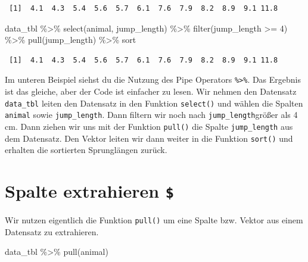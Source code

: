\documentclass[
  letterpaper,
]{scrbook}
\newenvironment{Shaded}{\begin{snugshade}}{\end{snugshade}}
\newcommand{\DecValTok}[1]{\textcolor[rgb]{0.68,0.00,0.00}{#1}}
\newcommand{\FunctionTok}[1]{\textcolor[rgb]{0.28,0.35,0.67}{#1}}
\newcommand{\NormalTok}[1]{\textcolor[rgb]{0.00,0.23,0.31}{#1}}
\newcommand{\SpecialCharTok}[1]{\textcolor[rgb]{0.37,0.37,0.37}{#1}}
\begin{document}
\begin{verbatim}
 [1]  4.1  4.3  5.4  5.6  5.7  6.1  7.6  7.9  8.2  8.9  9.1 11.8
\end{verbatim}

\begin{Shaded}
\begin{Highlighting}[]
\NormalTok{data\_tbl }\SpecialCharTok{\%\textgreater{}\%} 
  \FunctionTok{select}\NormalTok{(animal, jump\_length) }\SpecialCharTok{\%\textgreater{}\%} 
  \FunctionTok{filter}\NormalTok{(jump\_length }\SpecialCharTok{\textgreater{}=} \DecValTok{4}\NormalTok{) }\SpecialCharTok{\%\textgreater{}\%} 
  \FunctionTok{pull}\NormalTok{(jump\_length) }\SpecialCharTok{\%\textgreater{}\%} 
\NormalTok{  sort}
\end{Highlighting}
\end{Shaded}

\begin{verbatim}
 [1]  4.1  4.3  5.4  5.6  5.7  6.1  7.6  7.9  8.2  8.9  9.1 11.8
\end{verbatim}

Im unteren Beispiel siehst du die Nutzung des Pipe Operators
\texttt{\%\textgreater{}\%}. Das Ergebnis ist das gleiche, aber der Code
ist einfacher zu lesen. Wir nehmen den Datensatz \texttt{data\_tbl}
leiten den Datensatz in den Funktion \texttt{select()} und wählen die
Spalten \texttt{animal} sowie \texttt{jump\_length}. Dann filtern wir
noch nach \texttt{jump\_length}größer als 4 cm. Dann ziehen wir uns mit
der Funktion \texttt{pull()} die Spalte \texttt{jump\_length} aus dem
Datensatz. Den Vektor leiten wir dann weiter in die Funktion
\texttt{sort()} und erhalten die sortierten Sprunglängen zurück.

\hypertarget{sec-dollar}{%
\section{\texorpdfstring{Spalte extrahieren
\texttt{\$}}{Spalte extrahieren \$}}\label{sec-dollar}}

Wir nutzen eigentlich die Funktion \texttt{pull()} um eine Spalte bzw.
Vektor aus einem Datensatz zu extrahieren.

\begin{Shaded}
\begin{Highlighting}[]
\NormalTok{data\_tbl }\SpecialCharTok{\%\textgreater{}\%} 
  \FunctionTok{pull}\NormalTok{(animal)}
\end{Highlighting}
\end{Shaded}
\end{document}
